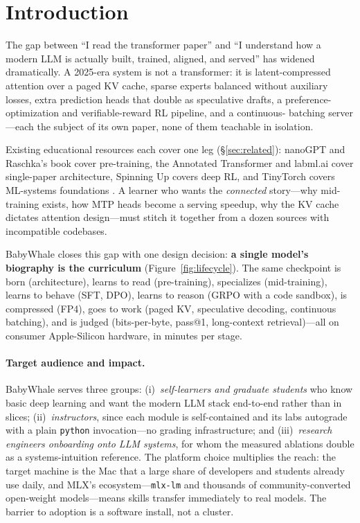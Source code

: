\section{Introduction}

The gap between ``I read the transformer paper'' \citep{vaswani2017attention}
and ``I understand how a
modern LLM is actually built, trained, aligned, and served'' has widened
dramatically. A 2025-era system is not a transformer: it is latent-compressed
attention over a paged KV cache, sparse experts balanced without auxiliary
losses, extra prediction heads that double as speculative drafts, a
preference-optimization and verifiable-reward RL pipeline, and a continuous-%
batching server---each the subject of its own paper, none of them teachable in
isolation.

Existing educational resources each cover one leg
(\S\ref{sec:related}): nanoGPT and Raschka's book cover pre-training, the
Annotated Transformer and labml.ai cover single-paper architecture, Spinning
Up covers deep RL, and TinyTorch covers ML-systems foundations
\citep{tinytorch2026}. A learner who wants the \emph{connected}
story---why mid-training exists, how MTP heads become a serving speedup, why
the KV cache dictates attention design---must stitch it together from a dozen
sources with incompatible codebases.

BabyWhale closes this gap with one design decision: \textbf{a single
model's biography is the curriculum} (Figure~\ref{fig:lifecycle}). The same
checkpoint is born (architecture), learns to read (pre-training), specializes
(mid-training), learns to behave (SFT, DPO), learns to reason (GRPO with a
code sandbox), is compressed (FP4), goes to work (paged KV, speculative
decoding, continuous batching), and is judged (bits-per-byte, pass@1,
long-context retrieval)---all on consumer Apple-Silicon hardware, in minutes
per stage.

\paragraph{Target audience and impact.} BabyWhale serves three groups:
(i)~\emph{self-learners and graduate students} who know basic deep learning
and want the modern LLM stack end-to-end rather than in slices;
(ii)~\emph{instructors}, since each module is self-contained and its labs
autograde with a plain \texttt{python} invocation---no grading
infrastructure; and (iii)~\emph{research engineers onboarding onto LLM
systems}, for whom the measured ablations double as a systems-intuition
reference. The platform choice multiplies the reach: the target machine is
the Mac that a large share of developers and students already use daily, and
MLX's ecosystem---\texttt{mlx-lm} and thousands of community-converted
open-weight models---means skills transfer immediately to real models. The
barrier to adoption is a software install, not a cluster.

